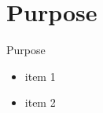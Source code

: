 \section{Purpose}
\begin{frame}{Purpose}

\begin{itemize}
	\item item 1
	\item item 2
\end{itemize}


\end{frame}
